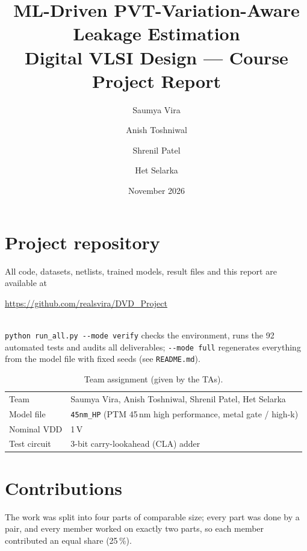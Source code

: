 \documentclass[11pt,a4paper]{article}
\title{\textbf{ML-Driven PVT-Variation-Aware Leakage Estimation}\\[4pt]
\large Digital VLSI Design --- Course Project Report}
\author{Saumya Vira \and Anish Toshniwal \and Shrenil Patel \and Het Selarka}
\date{November 2026}
\newcommand{\code}[1]{\texttt{\small #1}}
\newcommand{\pct}{\,\%}
\begin{document}
\maketitle

\section*{Project repository}
All code, datasets, netlists, trained models, result files and this report are available at\\[3pt]
\centerline{\large\url{https://github.com/realsvira/DVD_Project}}\\[3pt]
\code{python run\_all.py -{}-mode verify} checks the environment, runs the 92 automated tests and audits all
deliverables; \code{-{}-mode full} regenerates everything from the model file with fixed seeds
(see \code{README.md}).

\begin{table}[H]
\centering
\caption{Team assignment (given by the TAs).}
\begin{tabular}{ll}
\toprule
Team & Saumya Vira, Anish Toshniwal, Shrenil Patel, Het Selarka \\
Model file & \code{45nm\_HP} (PTM 45\,nm high performance, metal gate / high-k) \\
Nominal VDD & 1\,V \\
Test circuit & 3-bit carry-lookahead (CLA) adder \\
\bottomrule
\end{tabular}
\end{table}

\section*{Contributions}
The work was split into four parts of comparable size; every part was done by a pair, and every member
worked on exactly two parts, so each member contributed an equal share (25\pct).
\end{document}
